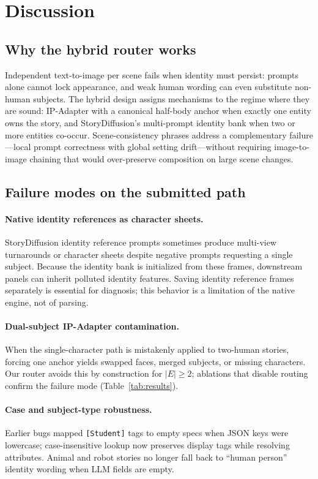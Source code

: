 \section{Discussion}
\label{sec:discussion}

\subsection{Why the hybrid router works}
Independent text-to-image per scene fails when identity must persist: prompts alone cannot lock appearance, and weak human wording can even substitute non-human subjects.
The hybrid design assigns mechanisms to the regime where they are sound: IP-Adapter with a canonical half-body anchor when exactly one entity owns the story, and StoryDiffusion's multi-prompt identity bank when two or more entities co-occur.
Scene-consistency phrases address a complementary failure---local prompt correctness with global setting drift---without requiring image-to-image chaining that would over-preserve composition on large scene changes.

\subsection{Failure modes on the submitted path}

\paragraph{Native identity references as character sheets.}
StoryDiffusion identity reference prompts sometimes produce multi-view turnarounds or character sheets despite negative prompts requesting a single subject.
Because the identity bank is initialized from these frames, downstream panels can inherit polluted identity features.
Saving identity reference frames separately is essential for diagnosis; this behavior is a limitation of the native engine, not of parsing.

\paragraph{Dual-subject IP-Adapter contamination.}
When the single-character path is mistakenly applied to two-human stories, forcing one anchor yields swapped faces, merged subjects, or missing characters.
Our router avoids this by construction for $|E|\geq 2$; ablations that disable routing confirm the failure mode (Table~\ref{tab:results}).

\paragraph{Case and subject-type robustness.}
Earlier bugs mapped \texttt{[Student]} tags to empty specs when JSON keys were lowercase; case-insensitive lookup now preserves display tags while resolving attributes.
Animal and robot stories no longer fall back to ``human person'' identity wording when LLM fields are empty.

